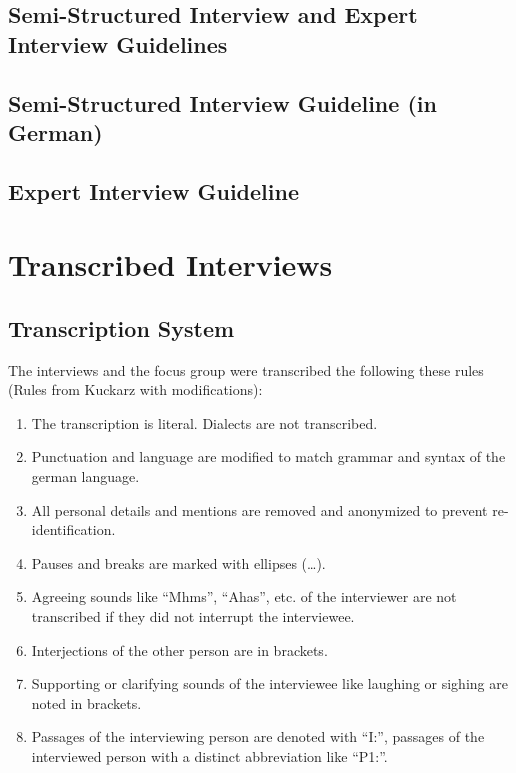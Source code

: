 \documentclass{sigchi}
\begin{document}
\begin{landscape}

\section{Semi-Structured Interview and Expert Interview Guidelines}
\subsection{Semi-Structured Interview Guideline (in German)}




\end{landscape}
\newpage

\twocolumn

\subsection{Expert Interview Guideline}




\section{Transcribed Interviews}

\subsection{Transcription System}
The interviews and the focus group were transcribed the following these rules (Rules from Kuckarz \cite{kuckartz2007} with modifications):
\begin{enumerate}
    \item The transcription is literal. Dialects are not transcribed.
    \item Punctuation and language are modified to match grammar and syntax of the german language.
    \item All personal details and mentions are removed and anonymized to prevent re-identification.
    \item Pauses and breaks are marked with ellipses (\dots).
    \item Agreeing sounds like ``Mhms'', ``Ahas'', etc. of the interviewer are not transcribed if they did not interrupt the interviewee.
    \item Interjections of the other person are in brackets.
    \item Supporting or clarifying sounds of the interviewee like laughing or sighing are noted in brackets.
    \item Passages of the interviewing person are denoted with ``I:'', passages of the interviewed person with a distinct abbreviation like ``P1:''.
\end{enumerate}
\end{document}
